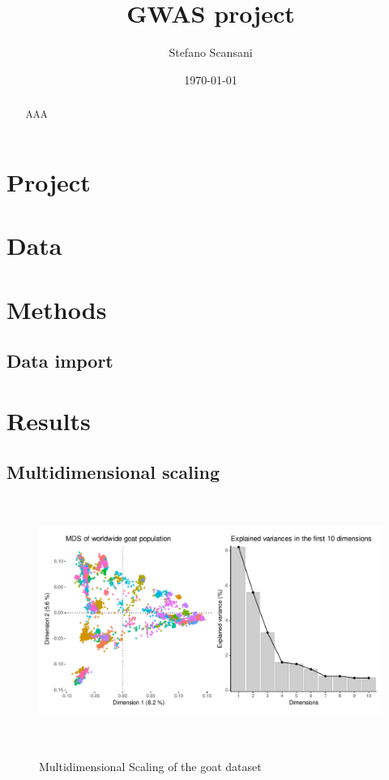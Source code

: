\documentclass[a4paper,onecolumn,12pt]{article}
\begin{document}
\title{GWAS project}
\author{Stefano Scansani}
\date{\today}
\maketitle
\begin{abstract}

    AAA

\end{abstract}
\tableofcontents
\listoffigures
\listoftables

\begin{twocolumn}

    \section{Project}

    \section{Data}

    \section{Methods}

    \subsection{Data import}
    \subsection{}

    \section{Results}

    \subsection{Multidimensional scaling}
    \begin{figure}
        \centering
        \includegraphics[height=8cm]{../Figures/goat_mds.pdf}
        \label{fig:gwas_pop_PCA}
        \caption{Multidimensional Scaling of the goat dataset}
    \end{figure}



\end{twocolumn}
\end{document}
